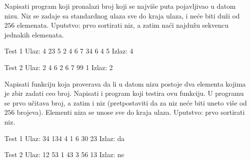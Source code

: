 \begin{Exercise}[label=503]
  Napisati program koji pronalazi broj koji se najviše puta
  pojavljivao u datom nizu. Niz se zadaje sa
  standardnog ulaza sve do kraja ulaza, i neće biti duži od $256$
  elemenata. Uputstvo: prvo sortirati niz, a zatim
  naći najdužu sekvencu jednakih elemenata.
  
\begin{miditest}
\begin{test}{Test 1}
Ulaz:   4 23 5 2 4 6 7 34 6 4 5
Izlaz:  4
\end{test}
\end{miditest}
\begin{miditest}
\begin{test}{Test 2}
Ulaz:   2 4 6 2 6 7 99 1
Izlaz:  2
\end{test}
\end{miditest}
  
\end{Exercise}

\begin{Exercise}[label=504]
  Napisati funkciju koja proverava da li u datom nizu postoje dva
  elementa kojima je zbir zadati ceo broj. Napisati i program koji testira ovu funkciju. U programu se 
  prvo učitava broj, a zatim i niz (pretpostaviti da za niz neće biti uneto više od $256$ brojeva). 
  Elementi niza se unose sve do kraja ulaza. Uputstvo: prvo sortirati
  niz.
  
\begin{miditest}
\begin{test}{Test 1}
Ulaz:   34 134 4 1 6 30 23
Izlaz:  da
\end{test}
\end{miditest}
\begin{miditest}
\begin{test}{Test 2}
Ulaz:   12 53 1 43 3 56 13
Izlaz:  ne
\end{test}
\end{miditest}
  
\end{Exercise}

